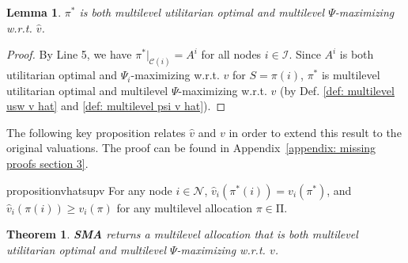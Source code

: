 \documentclass[]{article}
\newtheorem{theorem}{Theorem}
\newtheorem{lemma}{Lemma}
\newcommand{\nodes}{\mathcal{N}}
\newcommand{\children}{\mathcal{C}}
\newcommand{\internal}{\mathcal{I}}
\newcommand{\mallocations}{\mathrm{\Pi}}
\begin{document}
\begin{lemma} \label{corollary: SMA usw psi}
 $\pi^*$ is both multilevel utilitarian optimal and multilevel $\Psi$-maximizing w.r.t. $\hat{v}$.
\end{lemma}

\begin{proof} 
By Line 5, we have $\pi^*|_{\children(i)} = A^i$ for all nodes $i \in \internal$. Since $A^i$ is both utilitarian optimal and $\Psi_i$-maximizing w.r.t. $\hat{v}$ for $S = \pi(i)$, $\pi^*$ is multilevel utilitarian optimal and multilevel $\Psi$-maximizing w.r.t. $\hat{v}$ (by Def. \ref{def: multilevel usw v hat} and \ref{def: multilevel psi v hat}). 
\end{proof}

The following key proposition relates $\hat{v}$ and $v$ in order to extend this result to the original valuations. The proof can be found in Appendix~\ref{appendix: missing proofs section 3}. 

\begin{restatable}{proposition}{vhatsupv} \label{proposition:v hat  = and sup v}
    For any node $i \in \nodes$, $\hat{v}_i(\pi^*(i)) =  v_i(\pi^*)$, and $\hat{v}_i(\pi(i)) \geq  v_i(\pi)$ for any multilevel allocation $\pi \in \mallocations$.
\end{restatable}

\begin{theorem} \label{theorem: sma multilevel fair}
    {\bf SMA} returns a multilevel allocation that is both multilevel utilitarian optimal and multilevel $\Psi$-maximizing w.r.t. $v$.
\end{theorem}
\end{document}
